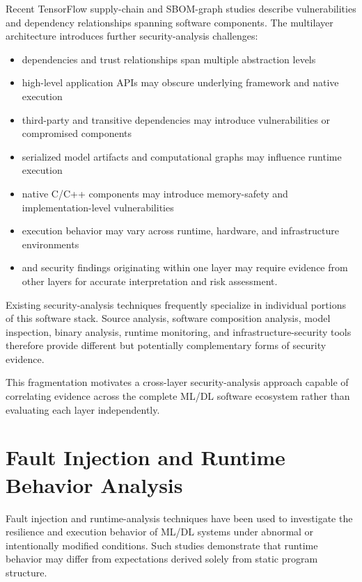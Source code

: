 \documentclass[
  12pt,
  letterpaper,
  oneside]{report}
\providecommand{\tightlist}{%
  \setlength{\itemsep}{0pt}\setlength{\parskip}{0pt}}
\begin{document}
Recent TensorFlow supply-chain and SBOM-graph studies describe
vulnerabilities and dependency relationships spanning software
components.\cite{zhou2025unraveling,tan2026securing,baird2026attackchains}
The multilayer architecture introduces further security-analysis
challenges:

\begin{itemize}
\tightlist
\item
  dependencies and trust relationships span multiple abstraction levels
\item
  high-level application APIs may obscure underlying framework and
  native execution
\item
  third-party and transitive dependencies may introduce vulnerabilities
  or compromised components
\item
  serialized model artifacts and computational graphs may influence
  runtime execution
\item
  native C/C++ components may introduce memory-safety and
  implementation-level vulnerabilities
\item
  execution behavior may vary across runtime, hardware, and
  infrastructure environments
\item
  and security findings originating within one layer may require
  evidence from other layers for accurate interpretation and risk
  assessment.
\end{itemize}

Existing security-analysis techniques frequently specialize in
individual portions of this software stack. Source analysis, software
composition analysis, model inspection, binary analysis, runtime
monitoring, and infrastructure-security tools therefore provide
different but potentially complementary forms of security evidence.

This fragmentation motivates a cross-layer security-analysis approach
capable of correlating evidence across the complete ML/DL software
ecosystem rather than evaluating each layer independently.

\section{Fault Injection and Runtime Behavior Analysis}\label{87-fault-injection-and-runtime-behavior-analysis}

Fault injection and runtime-analysis techniques have been used to
investigate the resilience and execution behavior of ML/DL systems under
abnormal or intentionally modified conditions. Such studies demonstrate
that runtime behavior may differ from expectations derived solely from
static program structure.
\end{document}
